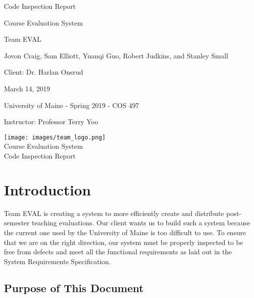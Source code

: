 \documentclass{article}
\begin{document}
\begin{titlepage}

\centering
\vspace*{2cm}
{\Huge Code Inspection Report\par}
\vspace{.25cm}
{\LARGE Course Evaluation System\par}
\vspace{1cm}
{\Large Team EVAL\par}
\vspace{.2cm}
{\Large Jovon Craig, Sam Elliott, Yuanqi Guo, Robert Judkins, and Stanley Small\par}
\vspace{1cm}
{\Large Client: Dr. Harlan Onsrud\par}
\vspace{1cm}
{\Large March 14, 2019\par}
\vspace{11cm}

University of Maine - Spring 2019 - COS 497

Instructor: Professor Terry Yoo

\end{titlepage}

\newpage

\begin{center}
{\texttt{[image: images/team\_logo.png]}} \\ 	\bigskip
{\LARGE Course Evaluation System } \\ \medskip
{\large Code Inspection Report } \\ \medskip
\end{center}

\tableofcontents

\newpage

\section{Introduction}

Team EVAL is creating a system to more efficiently create and distribute post-semester teaching evaluations. Our client wants us to build such a system because the current one used by the University of Maine is too difficult to use. To ensure that we are on the right direction, our system must be properly inspected to be free from defects and meet all the functional requirements as laid out in the System Requirements Specification.
 
\subsection{Purpose of This Document}
\end{document}
